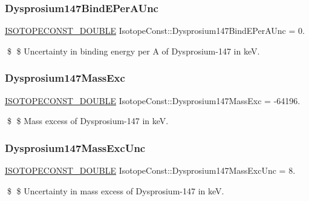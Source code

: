 \subsubsection{\texorpdfstring{Dysprosium147\+Bind\+E\+Per\+A\+Unc}{Dysprosium147BindEPerAUnc}}
{\footnotesize\ttfamily \mbox{\hyperlink{group___isotope_const-_macros_ga8f45a7272ce02c0b4c65c44636ed719a}{I\+S\+O\+T\+O\+P\+E\+C\+O\+N\+S\+T\+\_\+\+D\+O\+U\+B\+LE}} Isotope\+Const\+::\+Dysprosium147\+Bind\+E\+Per\+A\+Unc = 0.}

\$ \$ Uncertainty in binding energy per A of Dysprosium-\/147 in keV. \mbox{\label{group___isotope_const-_dysprosium-_dy147_ga79631ba44c3a137ee95988095c7ca8d3}} 
\subsubsection{\texorpdfstring{Dysprosium147\+Mass\+Exc}{Dysprosium147MassExc}}
{\footnotesize\ttfamily \mbox{\hyperlink{group___isotope_const-_macros_ga8f45a7272ce02c0b4c65c44636ed719a}{I\+S\+O\+T\+O\+P\+E\+C\+O\+N\+S\+T\+\_\+\+D\+O\+U\+B\+LE}} Isotope\+Const\+::\+Dysprosium147\+Mass\+Exc = -\/64196.}

\$ \$ Mass excess of Dysprosium-\/147 in keV. \mbox{\label{group___isotope_const-_dysprosium-_dy147_ga85efac451036737c4dd64741036eef42}} 
\subsubsection{\texorpdfstring{Dysprosium147\+Mass\+Exc\+Unc}{Dysprosium147MassExcUnc}}
{\footnotesize\ttfamily \mbox{\hyperlink{group___isotope_const-_macros_ga8f45a7272ce02c0b4c65c44636ed719a}{I\+S\+O\+T\+O\+P\+E\+C\+O\+N\+S\+T\+\_\+\+D\+O\+U\+B\+LE}} Isotope\+Const\+::\+Dysprosium147\+Mass\+Exc\+Unc = 8.}

\$ \$ Uncertainty in mass excess of Dysprosium-\/147 in keV. \mbox{\label{group___isotope_const-_dysprosium-_dy147_ga98a60e0cd06a05a6cd66c615204732f0}} 
